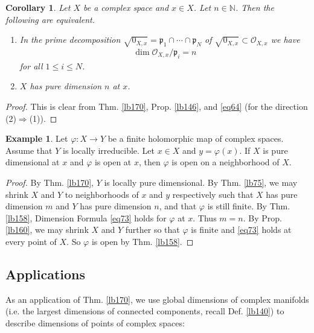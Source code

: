 \documentclass[12pt,b5paper,notitlepage]{report}
\theoremstyle{definition}
\newtheorem{eg}[df]{Example}
\theoremstyle{plain}
\newtheorem{co}[df]{Corollary}
\newcommand{\scr}{\mathscr}
\newcommand{\pk}{\mathfrak p}
\newcommand{\Nbb}{\mathbb N}
\numberwithin{equation}{section}
\begin{document}
\begin{co}
Let $X$ be a complex space and $x\in X$. Let $n\in\Nbb$. Then the following are equivalent.
\begin{enumerate}[label=(\arabic*)]
\item In the prime decomposition $\sqrt{0_{X,x}}=\pk_1\cap\cdots\cap\pk_N$ of $\sqrt{0_{X,x}}\subset\scr O_{X,x}$ we have
\begin{align*}
\dim \scr O_{X,x}/\pk_i=n
\end{align*}
for all $1\leq i\leq N$.
\item $X$ has pure dimension $n$ at $x$.
\end{enumerate}
\end{co}

\begin{proof}
This is clear from Thm. \ref{lb170}, Prop. \ref{lb146}, and \eqref{eq64} (for the direction (2)$\Rightarrow$(1)).
\end{proof}






\begin{eg}
Let $\varphi:X\rightarrow Y$ be a finite holomorphic map of complex spaces. Assume that $Y$ is locally irreducible. Let $x\in X$ and $y=\varphi(x)$. If $X$ is pure dimensional at $x$ and $\varphi$ is open at $x$, then $\varphi$ is open on a neighborhood of $X$. 
\end{eg}


\begin{proof}
By Thm. \ref{lb170}, $Y$ is locally pure dimensional. By Thm. \ref{lb75}, we may shrink $X$ and $Y$ to neighborhoods of $x$ and $y$ respectively such that $X$ has pure dimension $m$ and $Y$ has pure dimension $n$, and that $\varphi$ is still finite. By Thm. \ref{lb158}, Dimension Formula \eqref{eq73} holds for $\varphi$ at $x$. Thus $m=n$. By Prop. \ref{lb160}, we may shrink $X$ and $Y$ further so that $\varphi$ is finite and \eqref{eq73} holds at every point of $X$. So $\varphi$ is open by Thm. \ref{lb158}.
\end{proof}



\subsection{Applications}



As an application of Thm. \ref{lb170}, we use global dimensions of complex manifolds (i.e. the largest dimensions of connected components, recall Def. \ref{lb140}) to describe dimensions of points of complex spaces:
\end{document}

